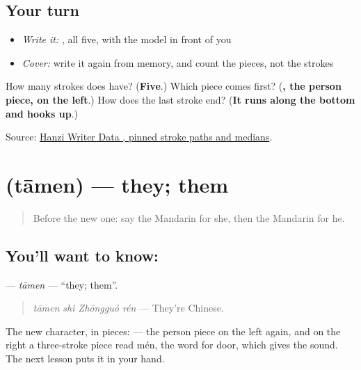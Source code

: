\subsection*{Your turn}
\begin{itemize}
\raggedright
  \item \emph{Write it:} , all five, with the model in front of you
  \item \emph{Cover:} write it again from memory, and count the pieces, not the strokes
\end{itemize}

\begin{tcolorbox}[breakable,colback=teal!4,colframe=teal!35!black,title={Before you move on}]
How many strokes does  have? (\textbf{Five}.) Which piece comes first? (\textbf{, the person piece, on the left}.) How does the last stroke end? (\textbf{It runs along the bottom and hooks up}.)

Source: \href{https://raw.githubusercontent.com/chanind/hanzi-writer-data/68d10a4b21150cae5e1ebbd223eed289cf32d90c/data/\%E4\%BB\%96.json}{Hanzi Writer Data , pinned stroke paths and medians}.
\end{tcolorbox}
\section[\texorpdfstring{\zh{他们} (tāmen)}{他们 (tāmen)}]{ (tāmen) — they; them}

\label{lesson:ZH-C31-tamen}



\begin{quote}
Before the new one: say the Mandarin for she, then the Mandarin for he.
\end{quote}

\subsection*{You'll want to know: }
\textbf{} — \emph{tāmen} — \textquotedblleft{}they; them\textquotedblright{}.

\begin{quote}
\textbf{} \emph{tāmen shì Zhōngguó rén} — They're Chinese.
\end{quote}

The new character, in pieces:  — the person piece on the left again, and on the right a three-stroke piece read mén, the word for door, which gives the sound. The next lesson puts it in your hand.

